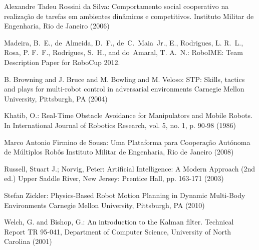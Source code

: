 \documentclass{llncs}
\begin{document}
\begin{thebibliography}{7}

Alexandre Tadeu Rossini da Silva:
Comportamento social cooperativo na realização de tarefas em
ambientes dinâmicos e competitivos. 
Instituto Militar de Engenharia, Rio de Janeiro (2006)

Madeira, B.~E., de~Almeida, D.~F., de~C.~Maia~Jr., E., Rodrigues, L. R.~L.,
  Rosa, P. F.~F., Rodrigues, S.~H., and do~Amaral, T. A.~N.:
RoboIME: Team Description Paper for RoboCup 2012.

B. Browning and J. Bruce and M. Bowling and M. Veloso:
STP: Skills, tactics and plays for multi-robot control in adversarial environments
Carnegie Mellon University, Pittsburgh, PA (2004)

Khatib, O.:
Real-Time Obstacle Avoidance for Manipulators and Mobile Robots. 
In International Journal of Robotics Research, vol. 5, no. 1, p. 90-98 (1986)

Marco Antonio Firmino de Sousa:
Uma Plataforma para Cooperação Autónoma de Múltiplos Robôs
Instituto Militar de Engenharia, Rio de Janeiro (2008)

 Russell, Stuart J.; Norvig, Peter: 
Artificial Intelligence: A Modern Approach (2nd ed.) 
Upper Saddle River, New Jersey: Prentice Hall, pp. 163-171 (2003)

Stefan Zickler:
Physics-Based Robot Motion Planning in Dynamic Multi-Body Environments
Carnegie Mellon University, Pittsburgh, PA (2010)

Welch, G. and Bishop, G.:  
An introduction to the Kalman filter. Technical Report TR 95-041, Department of
Computer Science, University of North Carolina (2001)




\end{thebibliography}
\end{document}
